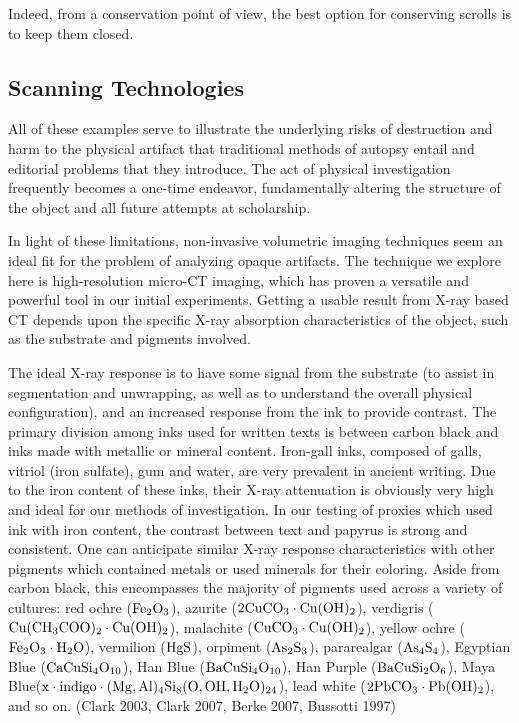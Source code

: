 \documentclass[12pt]{article}
\begin{document}
Indeed, from a conservation point of view, the best option for conserving scrolls is to keep them closed.

\subsection*{Scanning Technologies}

All of these examples serve to illustrate the underlying risks of destruction and harm to the physical artifact that traditional methods of autopsy entail and editorial problems that they introduce. The act of physical investigation frequently becomes a one-time endeavor, fundamentally altering the structure of the object and all future attempts at scholarship.

In light of these limitations, non-invasive volumetric imaging techniques seem an ideal fit for the problem of analyzing opaque artifacts. The technique we explore here is high-resolution micro-CT imaging, which has proven a versatile and powerful tool in our initial experiments. Getting a usable result from X-ray based CT depends upon the specific X-ray absorption characteristics of the object, such as the substrate and pigments involved.

The ideal X-ray response is to have some signal from the substrate (to assist in segmentation and unwrapping, as well as to understand the overall physical configuration), and an increased response from the ink to provide contrast. The primary division among inks used for written texts is between carbon black and inks made with metallic or mineral content. Iron-gall inks, composed of galls, vitriol (iron sulfate), gum and water, are very prevalent in ancient writing. Due to the iron content of these inks, their X-ray attenuation is obviously very high and ideal for our methods of investigation. In our testing of proxies which used ink with iron content, the contrast between text and papyrus is strong and consistent. One can anticipate similar X-ray response characteristics with other pigments which contained metals or used minerals for their coloring. Aside from carbon black, this encompasses the majority of pigments used across a variety of cultures: red ochre ($\rm Fe_2O_3$), azurite ($\rm 2CuCO_3\cdot Cu(OH)_2$), verdigris ($\rm Cu(CH_3COO)_2\cdot Cu(OH)_2$), malachite ($\rm CuCO_3\cdot Cu(OH)_2$), yellow ochre ($\rm Fe_2O_3\cdot H_2O$), vermilion ($\rm HgS$), orpiment ($\rm As_2S_3$), pararealgar ($\rm As_4S_4$), Egyptian Blue ($\rm CaCuSi_4O_{10}$), Han Blue ($\rm BaCuSi_4O_{10}$), Han Purple ($\rm BaCuSi_2O_6$), Maya Blue($\rm x\cdot indigo\cdot (Mg,Al)_4Si_8(O,OH,H_2O)_{24}$), lead white ($\rm 2PbCO_3\cdot Pb(OH)_2$), and so on. (Clark 2003, Clark 2007, Berke 2007, Bussotti 1997)
\end{document}
